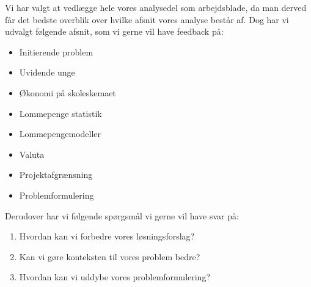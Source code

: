 Vi har valgt at vedlægge hele vores analysedel som arbejdsblade, da man derved får det bedste overblik over hvilke afsnit vores analyse består af. Dog har vi udvalgt følgende afsnit, som vi gerne vil have feedback på:

\begin{itemize}
\item Initierende problem
\item Uvidende unge
\item Økonomi på skoleskemaet
\item Lommepenge statistik
\item Lommepengemodeller%
\item Valuta
\item Projektafgrænsning
\item Problemformulering
\end{itemize}

\noindent  Derudover har vi følgende spørgsmål vi gerne vil have svar på:\\

\begin{enumerate}
\item Hvordan kan vi forbedre vores løsningsforslag?
\item Kan vi gøre konteksten til vores problem bedre?
\item Hvordan kan vi uddybe vores problemformulering?
\end{enumerate}
